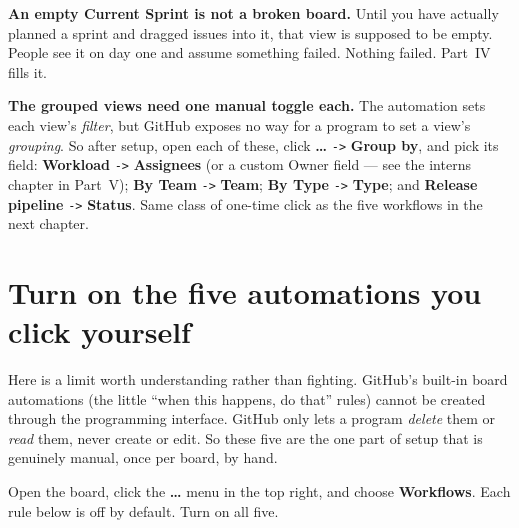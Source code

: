 \documentclass[11pt,a4paper]{report}
\newcommand{\code}[1]{\texttt{#1}}
\begin{document}
\begin{notebox}
\textbf{An empty Current Sprint is not a broken board.} Until you have actually
planned a sprint and dragged issues into it, that view is supposed to be empty.
People see it on day one and assume something failed. Nothing failed. Part~IV fills
it.
\end{notebox}

\begin{gotcha}
\textbf{The grouped views need one manual toggle each.} The automation sets each
view's \emph{filter}, but GitHub exposes no way for a program to set a view's
\emph{grouping}. So after setup, open each of these, click \textbf{\ldots}
\code{->} \textbf{Group by}, and pick its field: \textbf{Workload} \code{->}
\textbf{Assignees} (or a custom Owner field --- see the interns chapter in Part~V);
\textbf{By Team} \code{->} \textbf{Team}; \textbf{By Type} \code{->} \textbf{Type};
and \textbf{Release pipeline} \code{->} \textbf{Status}. Same class of one-time
click as the five workflows in the next chapter.
\end{gotcha}

\chapter{Turn on the five automations you click yourself}

Here is a limit worth understanding rather than fighting. GitHub's built-in board
automations (the little ``when this happens, do that'' rules) cannot be created
through the programming interface. GitHub only lets a program \emph{delete} them or
\emph{read} them, never create or edit. So these five are the one part of setup that
is genuinely manual, once per board, by hand.

Open the board, click the \textbf{\ldots} menu in the top right, and choose
\textbf{Workflows}. Each rule below is off by default. Turn on all five.
\end{document}
